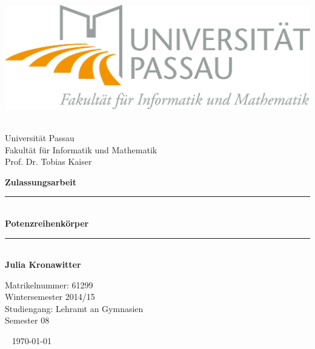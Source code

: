 
\thispagestyle{empty}
%
\begin{center}
\includegraphics[scale=2]{logo.png}
\end{center}
%
\begin{center}
\Large
~\\[0.2cm]
Universität Passau \\
Fakultät für Informatik und Mathematik \\
Prof. Dr. Tobias Kaiser \\
\vspace{50pt}
\end{center}
%
{\huge \centering
\textbf{Zulassungsarbeit}
\vspace{40pt}\\}

%

{\Large\centering
\rule{\textwidth}{3pt}
~\\[0.01cm]
{\fontsize{30pt}{25pt}\selectfont\bfseries Potenzreihenkörper}
~\\[0.01cm]
\rule{\textwidth}{3pt}
~\\[0.4cm]
\vfill
{\centering
\Large \bfseries Julia Kronawitter\\}
\vfill
\begin{center}
Matrikelnummer: 61299 \\
Wintersemester 2014/15\\
Studiengang: Lehramt an Gymnasien\\
Semester 08 \\
\end{center}
}
\vspace{70pt}
%
%
%
{\centering

~\vfill
\today\\}